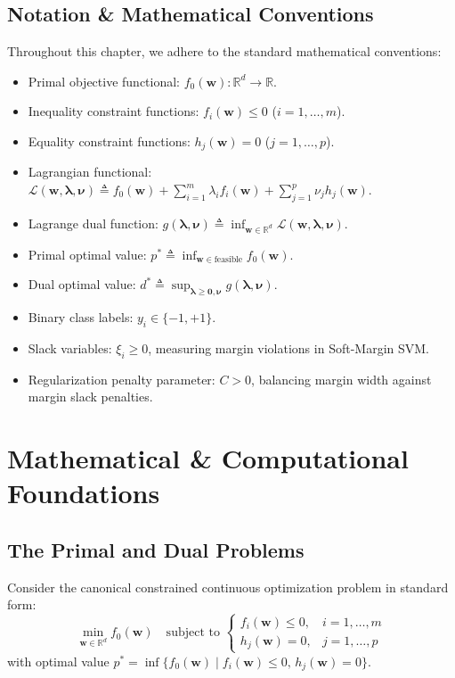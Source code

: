 \subsection{Notation \& Mathematical Conventions}
Throughout this chapter, we adhere to the standard mathematical conventions:
\begin{itemize}
    \item Primal objective functional: $f_0(\mathbf{w}): \mathbb{R}^d \to \mathbb{R}$.
    \item Inequality constraint functions: $f_i(\mathbf{w}) \le 0$ ($i = 1, \dots, m$).
    \item Equality constraint functions: $h_j(\mathbf{w}) = 0$ ($j = 1, \dots, p$).
    \item Lagrangian functional: $\mathcal{L}(\mathbf{w}, \boldsymbol{\lambda}, \boldsymbol{\nu}) \triangleq f_0(\mathbf{w}) + \sum_{i=1}^m \lambda_i f_i(\mathbf{w}) + \sum_{j=1}^p \nu_j h_j(\mathbf{w})$.
    \item Lagrange dual function: $g(\boldsymbol{\lambda}, \boldsymbol{\nu}) \triangleq \inf_{\mathbf{w} \in \mathbb{R}^d} \mathcal{L}(\mathbf{w}, \boldsymbol{\lambda}, \boldsymbol{\nu})$.
    \item Primal optimal value: $p^* \triangleq \inf_{\mathbf{w} \in \text{feasible}} f_0(\mathbf{w})$.
    \item Dual optimal value: $d^* \triangleq \sup_{\boldsymbol{\lambda} \ge \mathbf{0}, \boldsymbol{\nu}} g(\boldsymbol{\lambda}, \boldsymbol{\nu})$.
    \item Binary class labels: $y_i \in \{-1, +1\}$.
    \item Slack variables: $\xi_i \ge 0$, measuring margin violations in Soft-Margin SVM.
    \item Regularization penalty parameter: $C > 0$, balancing margin width against margin slack penalties.
\end{itemize}

\section{Mathematical \& Computational Foundations}

\subsection{The Primal and Dual Problems}
Consider the canonical constrained continuous optimization problem in standard form:
\begin{equation}
\min_{\mathbf{w} \in \mathbb{R}^d} f_0(\mathbf{w}) \quad \text{subject to } \begin{cases} f_i(\mathbf{w}) \le 0, & i = 1, \dots, m \\ h_j(\mathbf{w}) = 0, & j = 1, \dots, p \end{cases}
\label{eq:standard_primal}
\end{equation}
with optimal value $p^* = \inf \{f_0(\mathbf{w}) \mid f_i(\mathbf{w}) \le 0, \, h_j(\mathbf{w}) = 0\}$.

